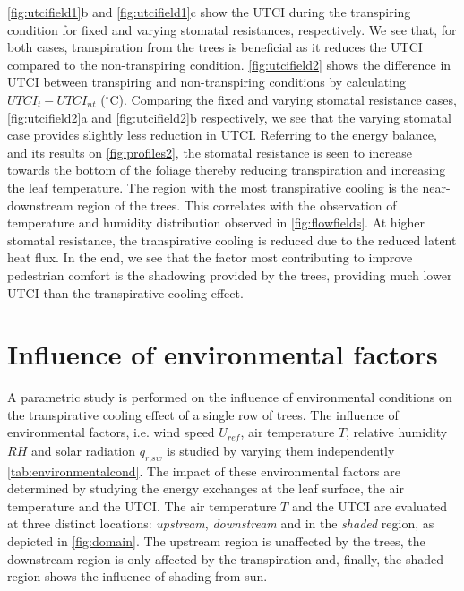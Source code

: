 \cref{fig:utcifield1}b and \cref{fig:utcifield1}c show the UTCI during the transpiring condition for fixed and varying stomatal resistances, respectively. We see that, for both cases, transpiration from the trees is beneficial as it reduces the UTCI compared to the non-transpiring condition. \cref{fig:utcifield2} shows the difference in UTCI between transpiring and non-transpiring conditions by calculating $\textit{UTCI}_t-\textit{UTCI}_{\textit{nt}}$ ($^{\circ}$C). Comparing the fixed and varying stomatal resistance cases, \cref{fig:utcifield2}a and \cref{fig:utcifield2}\-b respectively, we see that the varying stomatal case provides slightly less reduction in UTCI. Referring to the energy balance, and its results on \cref{fig:profiles2}, the stomatal resistance is seen to increase towards the bottom of the foliage thereby reducing transpiration and increasing the leaf temperature. The region with the most transpirative cooling is the near-downstream region of the trees. This correlates with the observation of temperature and humidity distribution observed in \cref{fig:flowfields}. At higher stomatal resistance, the transpirative cooling is reduced due to the reduced latent heat flux. In the end, we see that the factor most contributing to improve pedestrian comfort is the shadowing provided by the trees, providing much lower UTCI than the transpirative cooling effect. 

\section{Influence of environmental factors}

A parametric study is performed on the influence of environmental conditions on the transpirative cooling effect of a single row of trees. The influence of environmental factors, i.e. wind speed $U_{\textit{ref}}$, air temperature $T$, relative humidity $\textit{RH}$ and solar radiation $q_{\textit{r,sw}}$ is studied by varying them independently \cref{tab:environmentalcond}. The impact of these environmental factors are determined by studying the energy exchanges at the leaf surface, the air temperature and the UTCI. The air temperature $T$ and the UTCI are evaluated at three distinct locations: \textit{upstream}, \textit{downstream} and in the \textit{shaded} region, as depicted in \cref{fig:domain}. The upstream region is unaffected by the trees, the downstream region is only affected by the transpiration and, finally, the shaded region shows the influence of shading from sun. 


